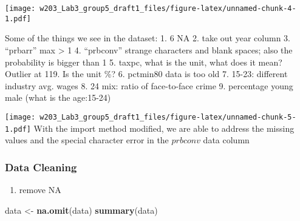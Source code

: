 \documentclass[]{article}
\newenvironment{Shaded}{\begin{snugshade}}{\end{snugshade}}
\newcommand{\KeywordTok}[1]{\textcolor[rgb]{0.13,0.29,0.53}{\textbf{#1}}}
\newcommand{\DataTypeTok}[1]{\textcolor[rgb]{0.13,0.29,0.53}{#1}}
\newcommand{\DecValTok}[1]{\textcolor[rgb]{0.00,0.00,0.81}{#1}}
\newcommand{\StringTok}[1]{\textcolor[rgb]{0.31,0.60,0.02}{#1}}
\newcommand{\OperatorTok}[1]{\textcolor[rgb]{0.81,0.36,0.00}{\textbf{#1}}}
\newcommand{\NormalTok}[1]{#1}
\providecommand{\tightlist}{%
  \setlength{\itemsep}{0pt}\setlength{\parskip}{0pt}}
\begin{document}
\begin{Shaded}
\end{Shaded}

\texttt{[image: w203\_Lab3\_group5\_draft1\_files/figure-latex/unnamed-chunk-4-1.pdf]}

Some of the things we see in the dataset: 1. 6 NA 2. take out year
column 3. ``prbarr'' max \textgreater{} 1 4. ``prbconv'' strange
characters and blank spaces; also the probability is bigger than 1 5.
taxpc, what is the unit, what does it mean? Outlier at 119. Is the unit
\%? 6. pctmin80 data is too old 7. 15-23: different industry avg. wages
8. 24 mix: ratio of face-to-face crime 9. percentage young male (what is
the age:15-24)

\begin{Shaded}
\end{Shaded}

\texttt{[image: w203\_Lab3\_group5\_draft1\_files/figure-latex/unnamed-chunk-5-1.pdf]}
With the import method modified, we are able to address the missing
values and the special character error in the \(prbconv\) data column

\subsubsection{Data Cleaning}\label{data-cleaning}

\begin{enumerate}
\def\labelenumi{\arabic{enumi}.}
\tightlist
\item
  remove NA
\end{enumerate}

\begin{Shaded}
\begin{Highlighting}[]
\NormalTok{data <-}\StringTok{ }\KeywordTok{na.omit}\NormalTok{(data)}
\KeywordTok{summary}\NormalTok{(data)}
\end{Highlighting}
\end{Shaded}
\end{document}
